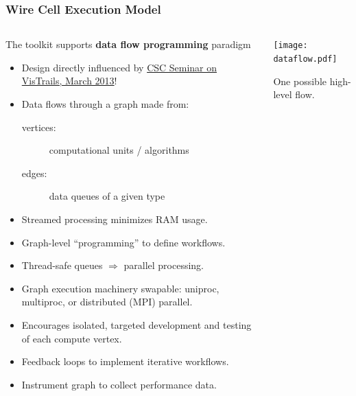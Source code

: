\documentclass[xcolor=dvipsnames]{beamer}
\begin{document}
\begin{frame}[fragile]
  \frametitle{Wire Cell Execution Model}

  \begin{columns}
    \begin{column}{0.7\textwidth}
      \footnotesize 
      The toolkit supports \textbf{data flow programming} paradigm
      \begin{itemize}
        \item Design directly influenced by
          \href{http://www0.bnl.gov/events/details.php?q=8932}{CSC Seminar on VisTrails, March 2013}!
        \item Data flows through a graph made from:
          \begin{description}
          \item[vertices:] computational units / algorithms
          \item[edges:] data queues of a given type
          \end{description}
        \item Streamed processing minimizes RAM usage.
        \item Graph-level ``programming'' to define workflows.
        \item Thread-safe queues $\Rightarrow$ parallel processing.
        \item Graph execution machinery swapable: uniproc, multiproc, or
          distributed (MPI) parallel.
        \item Encourages isolated, targeted development and testing of each
          compute vertex.
        \item Feedback loops to implement iterative workflows.
        \item Instrument graph to collect performance data.
        \end{itemize}
      \end{column}
      \begin{column}{0.3\textwidth}

        \vspace{-10mm}

        \texttt{[image: dataflow.pdf]}

        \tiny One possible high-level flow.
      \end{column}
    \end{columns}
\end{frame}
\end{document}
